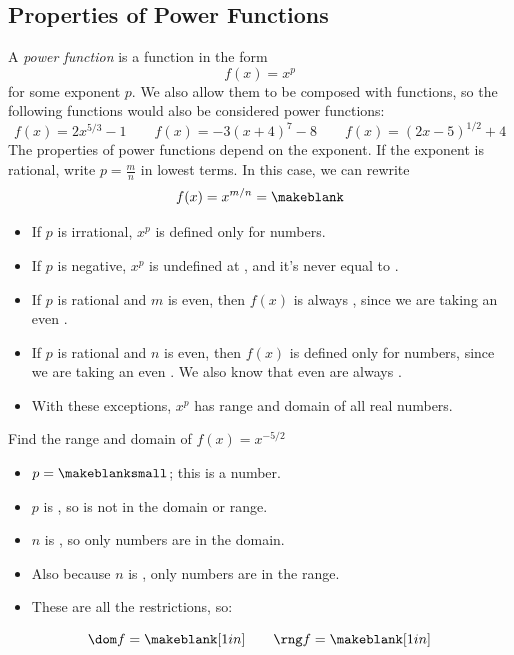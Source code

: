 \subsection{Properties of Power Functions} 
A \emph{power function} is a function in the form
\[
f(x)=x^p
\]
for some exponent $p$. We also allow them to be composed with \makeblank[1in] functions, so the following functions would also be considered power functions:
\[
f(x)=2x^{5/3}-1
\qquad
f(x)=-3(x+4)^7-8
\qquad
f(x)=(2x-5)^{1/2}+4
\]
The properties of power functions depend on the exponent. If the exponent is rational, write $p=\frac{m}{n}$ in lowest terms. In this case, we can rewrite 
$$f(x)=x^{m/n}=\makeblank$$
\begin{itemize}
\item If $p$ is irrational, $x^p$ is defined only for \makeblank[1.5in] numbers.
\item If $p$ is negative, $x^p$ is undefined at \makeblanksmall, and it's never equal to \makeblanksmall.
\item If $p$ is rational and $m$ is even, then $f(x)$ is always \makeblank[1.5in], since we are taking an even \makeblank[1in].
\item If $p$ is rational and $n$ is even, then $f(x)$ is defined only for \makeblank[1.5in] numbers, since we are taking an even \makeblank[1in]. We also know that even \makeblank[1in] are always \makeblank[1.5in]. 
\item With these exceptions, $x^p$ has range and domain of all real numbers.
\end{itemize}
\begin{Example}
Find the range and domain of $f(x)=x^{-5/2}$
\begin{itemize}
\item $p=\makeblanksmall$; this is a \makeblank[1.5in] number.
\item $p$ is \makeblank[1.5in], so \makeblanksmall is not in the domain or range.
\item $n$ is \makeblank[1in], so only \makeblank[1.5in] numbers are in the domain.
\item Also because $n$ is \makeblank[1in], only \makeblank[1.5in] numbers are in the range.
\item These are all the restrictions, so:
\end{itemize}
\[
\dom f = \makeblank[1in]
\qquad
\rng f = \makeblank[1in]
\]
\end{Example}